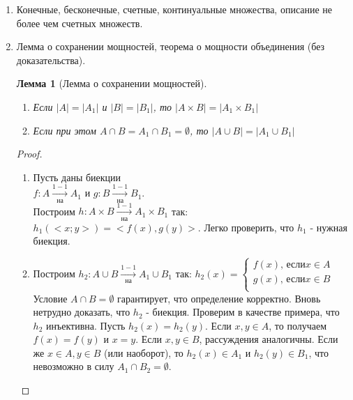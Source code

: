 \documentclass[a4paper]{article}
\newtheorem*{lemma*}{Лемма}
\theoremstyle{definition}
\begin{document}
\begin{enumerate}
 \item Конечные, бесконечные, счетные, континуальные множества, описание не более чем счетных множеств.
 \item Лемма о сохранении мощностей, теорема о мощности объединения (без доказательства).
       \begin{lemma*}[Лемма о сохранении мощностей]\mbox{}\\
        \begin{enumerate}
         \item Если $\left | A \right | = \left | A_{1} \right |$ и $\left | B \right | = \left | B_{1} \right |$, то $\left | A\times B \right | = \left | A_{1}\times B_{1} \right |$\\
         \item Если при этом $A\cap B = A_{1}\cap B_{1}=\emptyset $, то $\left | A \cup B \right | =\left | A_{1} \cup B_{1} \right |  $
        \end{enumerate}
       \end{lemma*}
       \begin{proof}\mbox{}\\
        \begin{enumerate}
         \item Пусть даны биекции \\$f : A\xrightarrow[\text{на}]{1-1}A_{1}$ и $g : B\xrightarrow[\text{на}]{1-1}B_{1}$.\\
                Построим $h : A \times B\xrightarrow[\text{на}]{1-1}A_{1} \times B_{1}$ так:
               $h_{1}(<x;y>)=<f(x),g(y)>$.
                Легко проверить, что $h_{1}$ - нужная биекция.
         \item Построим $h_{2} : A\cup B \xrightarrow[\text{на}]{1-1}A_{1}\cup B_{1}$ так:
               $h_{2}(x) =
                \left\{
                \begin{matrix}
                 f(x)\text{, если} x \in A \\
                 g(x)\text{, если} x \in B \\
                \end{matrix}
                \right.$
               Условие $A \cap B = \emptyset$ гарантирует, что определение корректно.
               Вновь нетрудно доказать, что $h_{2}$ - биекция. Проверим в качестве примера, что $h_{2}$ инъективна. Пусть $h_{2}(x)=h_{2}(y)$. Если $x,y \in A$, то получаем $f(x)=f(y)$ и $x=y$. Если $x,y \in B$, рассуждения аналогичны. Если же $x \in A, y \in B$  (или наоборот), то $h_{2}(x) \in A_{1}$ и $h_{2}(y) \in B_{1}$, что невозможно в силу $A_{1} \cap B_{2} = \emptyset$.

\end{enumerate}
\end{proof}
\end{enumerate}
\end{document}
